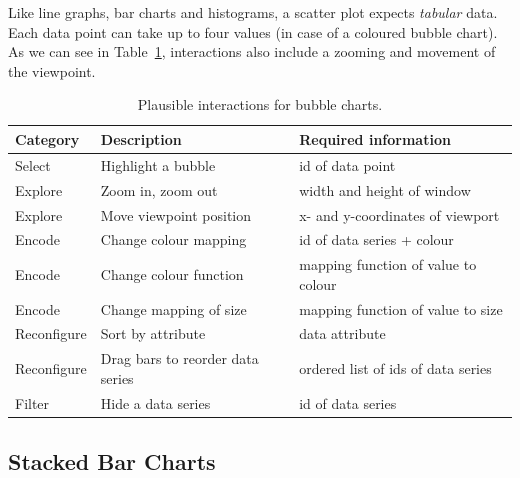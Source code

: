 Like line graphs, bar charts and histograms, a scatter plot expects \emph{tabular} data.
Each data point can take up to four values (in case of a coloured bubble chart).
As we can see in Table~\ref{tab:analysis:bubble-charts:interactions}, interactions also include a zooming and movement of the viewpoint.
\begin{table}[H]
  \caption{Plausible interactions for bubble charts.}%
  \label{tab:analysis:bubble-charts:interactions}
  \begin{tabularx}{\linewidth}{lXX}
    \bf Category & \bf Description & \bf Required information \\
    \hline
    Select & Highlight a bubble & id of data point \\
    Explore & Zoom in, zoom out & width and height of window \\
    Explore & Move viewpoint position & x- and y-coordinates of viewport \\
    Encode & Change colour mapping & id of data series + colour \\
    Encode & Change colour function & mapping function of value to colour \\
    Encode & Change mapping of size & mapping function of value to size \\
    Reconfigure & Sort by attribute & data attribute \\
    Reconfigure & Drag bars to reorder data series & ordered list of ids of data series \\
    Filter & Hide a data series & id of data series \\
  \end{tabularx}
\end{table}

\subsection{Stacked Bar Charts}

